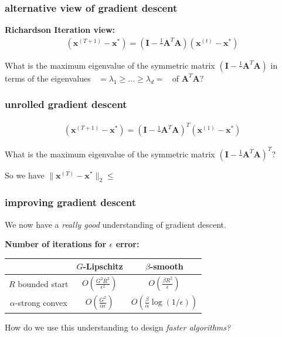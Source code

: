 \documentclass[compress]{beamer}
\newcommand{\bv}[1]{\mathbf{#1}}
\DeclareMathOperator*{\lmin}{\lambda_{min}}
\DeclareMathOperator*{\lmax}{\lambda_{max}}
\begin{document}
\begin{frame}[t]
	\frametitle{alternative view of gradient descent}
	\textbf{Richardson Iteration view:}
	\begin{align*}
	(\bv{x}^{(T+1)} - \bv{x}^*) =  \left(\bv{I} - \frac{1}{\lmax}\bv{A}^T\bv{A}\right)(\bv{x}^{(t)} - \bv{x}^*) 
	\end{align*}


\vspace{10em}
	What is the maximum eigenvalue of the symmetric matrix $\left(\bv{I} - \frac{1}{\lmax}\bv{A}^T\bv{A}\right)$ in terms of the eigenvalues $\lmax = \lambda_1 \geq \ldots \geq \lambda_d = \lmin$ of $\bv{A}^T\bv{A}$?
\end{frame}

\begin{frame}[t]
	\frametitle{unrolled gradient descent}
	\begin{align*}
	(\bv{x}^{(T+1)} - \bv{x}^*) =  \left(\bv{I} - \frac{1}{\lmax}\bv{A}^T\bv{A}\right)^T(\bv{x}^{(1)} - \bv{x}^*) 
	\end{align*}
	
\vspace{3em}
What is the maximum eigenvalue of the symmetric matrix $\left(\bv{I} - \frac{1}{\lmax}\bv{A}^T\bv{A}\right)^T$?

\vspace{5em}
So we have $\|\bv{x}^{(T)} - \bv{x}^*\|_2 \leq $
\end{frame}

\begin{frame}
	\frametitle{improving gradient descent}
	We now have a \emph{really good} understanding of gradient descent. 
	
\textbf{Number of iterations for $\epsilon$ error:}
\begin{center}
	\begin{tabular}{c|cc}
		& $G$-Lipschitz & $\beta$-smooth   \\ \hline
		$R$ bounded start & $O\left(\frac{G^2R^2}{\epsilon^2}\right)$ & $O\left(\frac{\beta R^2}{\epsilon}\right)$ \\
		$\alpha$-strong convex & $O\left(\frac{G^2}{\alpha\epsilon}\right)$ & $O\left(\frac{\beta}{\alpha}\log(1/\epsilon)\right)$
	\end{tabular}
\end{center}

\vspace{1em}
\alert{How do we use this understanding to design \emph{faster algorithms?}}
\end{frame}
\end{document}
